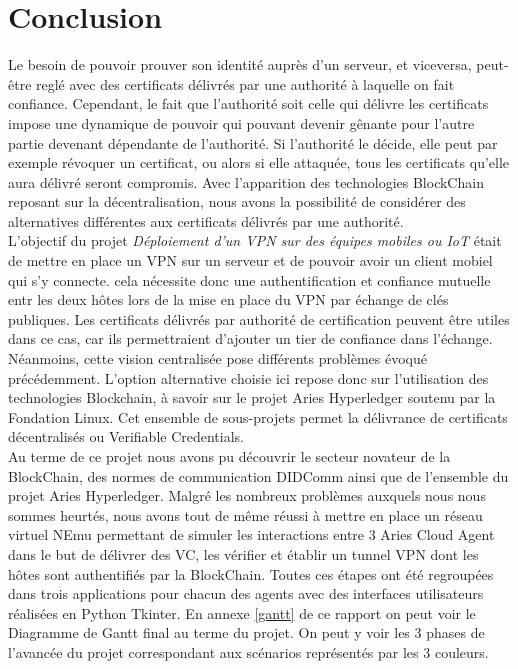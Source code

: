 \documentclass[12pt, openany]{report}
\begin{document}
\section{Conclusion}
\noindent 
\begin{flushleft}
Le besoin de pouvoir prouver son identité auprès d'un serveur, et viceversa, peut-être reglé avec des certificats délivrés par une authorité à laquelle on fait confiance. Cependant, le fait que l'authorité soit celle qui délivre les certificats impose une dynamique de pouvoir qui pouvant devenir gênante pour l'autre partie devenant dépendante de l'authorité. Si l'authorité le décide, elle peut par exemple révoquer un certificat, ou alors si elle attaquée, tous les certificats qu'elle aura délivré seront compromis. Avec l'apparition des technologies BlockChain reposant sur la décentralisation, nous avons la possibilité de considérer des alternatives différentes aux certificats délivrés par une authorité. \\
L'objectif du projet \textit{Déploiement d'un VPN sur des équipes mobiles ou IoT} était de mettre en place un VPN sur un serveur et de pouvoir avoir un client mobiel qui s'y connecte. cela nécessite donc une authentification et confiance mutuelle entr les deux hôtes lors de la mise en place du VPN par échange de clés publiques. Les certificats délivrés par authorité de certification peuvent être utiles dans ce cas, car ils permettraient d'ajouter un tier de confiance dans l'échange. Néanmoins, cette vision centralisée pose différents problèmes évoqué précédemment. L'option alternative choisie ici repose donc sur l'utilisation des technologies Blockchain, à savoir sur le projet Aries Hyperledger soutenu par la Fondation Linux. Cet ensemble de sous-projets permet la délivrance de certificats décentralisés ou Verifiable Credentials.\\
Au terme de ce projet nous avons pu découvrir le secteur novateur de la BlockChain, des normes de communication DIDComm ainsi que de l'ensemble du projet Aries Hyperledger. Malgré les nombreux problèmes auxquels nous nous sommes heurtés, nous avons tout de même réussi à mettre en place un réseau virtuel NEmu permettant de simuler les interactions entre 3 Aries Cloud Agent dans le but de délivrer des VC, les vérifier et établir un tunnel VPN dont les hôtes sont authentifiés par la BlockChain. Toutes ces étapes ont été regroupées dans trois applications pour chacun des agents avec des interfaces utilisateurs réalisées en Python Tkinter.
En annexe \ref{gantt} de ce rapport on peut voir le Diagramme de Gantt final au terme du projet. On peut y voir les 3 phases de l'avancée du projet correspondant aux scénarios représentés par les 3 couleurs.
\end{flushleft}
\end{document}
